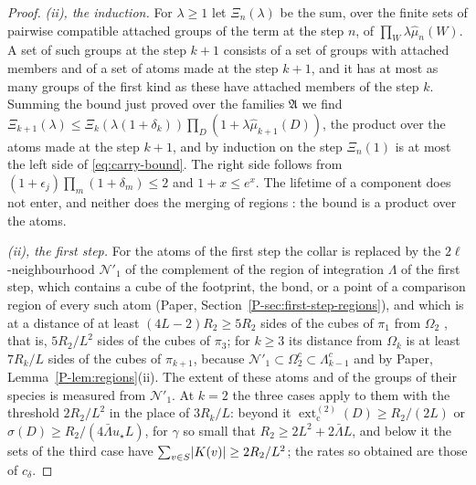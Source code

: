 \documentclass[11pt]{preprint}
\DeclarePairedDelimiter{\abs}{\lvert}{\rvert}
\numberwithin{equation}{section}
\theoremstyle{definition}
\theoremstyle{remark}
\theoremstyle{plain}
\begin{document}
\begin{proof}
\emph{(ii), the induction.} For $\lambda \geq 1$ let $\Xi_n(\lambda)$ be the sum, over the finite sets of pairwise compatible attached groups of the term at the step $n$, of $\prod_W\lambda\hat\mu_n(W)$. A set of such groups at the step $k + 1$ consists of a set of groups with attached members and of a set of atoms made at the step $k + 1$, and it has at most as many groups of the first kind as these have attached members of the step $k$. Summing the bound just proved over the families $\mathfrak A$ we find $\Xi_{k+1}(\lambda) \leq \Xi_k(\lambda(1 + \delta_k))\prod_D(1 + \lambda\hat\mu_{k+1}(D))$, the product over the atoms made at the step $k + 1$, and by induction on the step $\Xi_n(1)$ is at most the left side of \eqref{eq:carry-bound}. The right side follows from $(1 + \epsilon_j)\prod_m(1 + \delta_m) \leq 2$ and $1 + x \leq e^x$. The lifetime of a component does not enter, and neither does the merging of regions \cite[(1.84)--(1.88), pp.~385--387]{BalabanLFR2}: the bound is a product over the atoms.

\emph{(ii), the first step.} For the atoms of the first step the collar is replaced by the $2\ell$-neighbourhood $\mathcal N'_1$ of the complement of the region of integration $\Lambda$ of the first step, which contains a cube of the footprint, the bond, or a point of a comparison region of every such atom (Paper, Section~\ref{P-sec:first-step-regions}), and which is at a distance of at least $(4L - 2)R_2 \geq 5R_2$ sides of the cubes of $\pi_1$ from $\Omega_2$ \cite[(3.5), p.~265; (2.9), p.~256]{BalabanCRE}, that is, $5R_2/L^2$ sides of the cubes of $\pi_3$; for $k \geq 3$ its distance from $\Omega_k$ is at least $7R_k/L$ sides of the cubes of $\pi_{k+1}$, because $\mathcal N'_1 \subset \Omega_2^c \subset \Lambda_{k-1}^c$ and by Paper, Lemma~\ref{P-lem:regions}(ii). The extent of these atoms and of the groups of their species is measured from $\mathcal N'_1$. At $k = 2$ the three cases apply to them with the threshold $2R_2/L^2$ in the place of $3R_k/L$: beyond it $\operatorname{ext}^{(2)}_{\mathrm c}(D) \geq R_2/(2L)$ or $\sigma(D) \geq R_2/(4\bar\Lambda u_\star L)$, for $\gamma$ so small that $R_2 \geq 2L^2 + 2\bar\Lambda L$, and below it the sets of the third case have $\sum_{v \in S}\abs{K(v)} \geq 2R_2/L^2$; the rates so obtained are those of $c_\delta$.


\end{proof}
\end{document}
